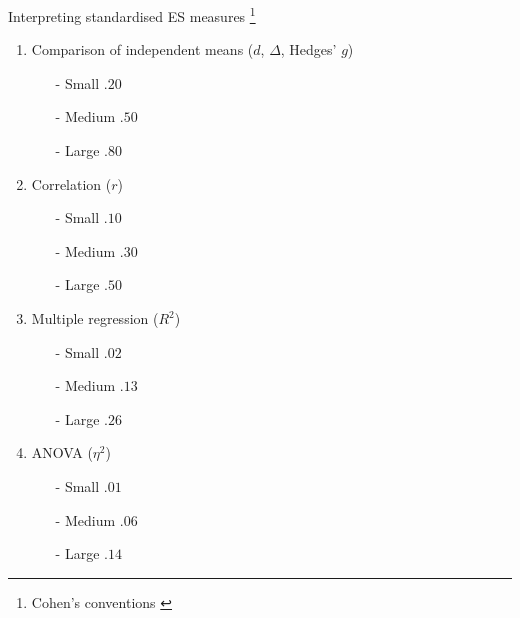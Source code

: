 \documentclass{beamer}
\begin{document}
% 
\begin{frame}{Interpreting standardised ES measures \footnote{\tiny{Cohen's conventions \citep{Ellis2010}}}}
	\begin{enumerate}  
	\item Comparison of independent means ($d$, $\Delta$, Hedges' $g$)
		\begin{itemize}
		\item[-] Small $.20$
		\item[-] Medium $.50$
		\item[-] Large $.80$
		\end{itemize}
	\item Correlation ($r$)
		\begin{itemize}
		\item[-] Small $.10$
		\item[-] Medium $.30$
		\item[-] Large $.50$
		\end{itemize}
	\item Multiple regression ($R^2$)
		\begin{itemize}
		\item[-] Small $.02$
		\item[-] Medium $.13$
		\item[-] Large $.26$
		\end{itemize}	
	\item ANOVA ($\eta^2$)
		\begin{itemize}
		\item[-] Small $.01$
		\item[-] Medium $.06$
		\item[-] Large $.14$
		\end{itemize}	
	\end{enumerate}
\end{frame}
\end{document}
